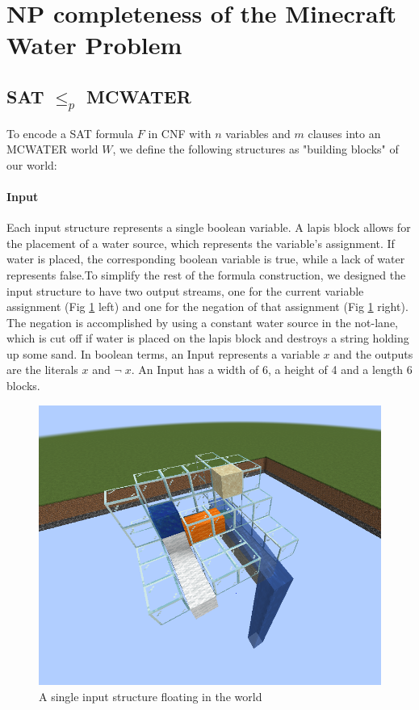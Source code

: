 \section{NP completeness of the Minecraft Water Problem}


\subsection{SAT $\leq_p$ MCWATER}
To encode a SAT formula $F$ in CNF with $n$ variables and $m$ clauses into an MCWATER world $W$, we define the following structures as "building blocks" of our world:



\paragraph{Input}
Each input structure represents a single boolean variable. A lapis block allows for the placement of a water source, which represents the variable's assignment. If water is placed, the corresponding boolean variable is true, while a lack of water represents false.\newline To simplify the rest of the formula construction, we designed the input structure to have two output streams, one for the current variable assignment (Fig \ref{fig:input} left) and one for the negation of that assignment (Fig \ref{fig:input} right). The negation is accomplished by using a constant water source in the not-lane, which is cut off if water is placed on the lapis block and destroys a string holding up some sand. In boolean terms, an Input represents a variable $x$ and the outputs are the literals $x$ and $\neg \; x$. An Input has a width of 6, a height of 4 and a length 6 blocks.

\begin{figure}[ht]
    \centering
    \includegraphics[width=0.5\linewidth]{images/input.png}
    \caption{A single input structure floating in the world}
    \label{fig:input}
\end{figure}



